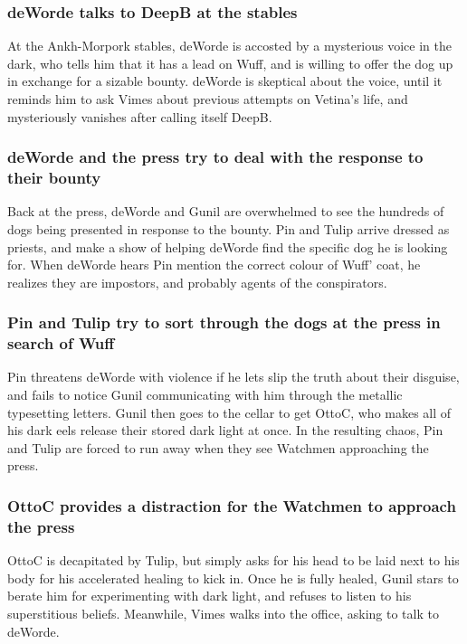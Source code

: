 \subsubsection{\Gls{deWorde} talks to \Gls{DeepB} at the stables}
At the Ankh-Morpork stables, \Gls{deWorde} is accosted by a mysterious voice in the dark, who tells
him that it has a lead on \Gls{Wuff}, and is willing to offer the dog up in exchange for a sizable
bounty. \Gls{deWorde} is skeptical about the voice, until it reminds him to ask \Gls{Vimes} about
previous attempts on \Gls{Vetina}'s life, and mysteriously vanishes after calling itself
\Gls{DeepB}.

\subsubsection{\Gls{deWorde} and the press try to deal with the response to their bounty}
Back at the press, \Gls{deWorde} and \Gls{Gunil} are overwhelmed to see the hundreds of dogs being
presented in response to the bounty. \Gls{Pin} and \Gls{Tulip} arrive dressed as priests, and make
a show of helping \Gls{deWorde} find the specific dog he is looking for. When \Gls{deWorde} hears
\Gls{Pin} mention the correct colour of \Gls{Wuff}' coat, he realizes they are impostors, and
probably agents of the conspirators.

\subsubsection{\Gls{Pin} and \Gls{Tulip} try to sort through the dogs at the press in search of
    \Gls{Wuff}}
\Gls{Pin} threatens \Gls{deWorde} with violence if he lets slip the truth about their disguise, and
fails to notice \Gls{Gunil} communicating with him through the metallic typesetting letters.
\Gls{Gunil} then goes to the cellar to get \Gls{OttoC}, who makes all of his dark eels release their
stored dark light at once. In the resulting chaos, \Gls{Pin} and \Gls{Tulip} are forced to run away
when they see Watchmen approaching the press.

\subsubsection{\Gls{OttoC} provides a distraction for the Watchmen to approach the press}
\Gls{OttoC} is decapitated by \Gls{Tulip}, but simply asks for his head to be laid next to his body
for his accelerated healing to kick in. Once he is fully healed, \Gls{Gunil} stars to berate him for
experimenting with dark light, and refuses to listen to his superstitious beliefs. Meanwhile,
\Gls{Vimes} walks into the office, asking to talk to \Gls{deWorde}.

